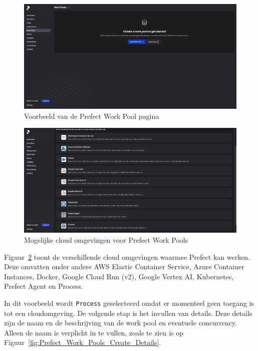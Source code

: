 \begin{figure}[h]
    \centering
    \includegraphics[width=0.9\linewidth]{graphics/Prefect_Work_Pools.PNG}
    \caption{Voorbeeld van de Prefect Work Pool pagina}
    \label{fig:Prefect_Work_Pools}
\end{figure}

\begin{figure}[h]
    \centering
    \includegraphics[width=0.9\linewidth]{graphics/Prefect_Work_Pools_Create.PNG}
    \caption{Mogelijke cloud omgevingen voor Prefect Work Pools}
    \label{fig:Prefect_Work_Pools_Create}
\end{figure}

Figuur~\ref{fig:Prefect_Work_Pools_Create} toont de verschillende cloud omgevingen waarmee Prefect kan werken. Deze omvatten onder andere AWS Elastic Container Service, Azure Container Instances, Docker, Google Cloud Run (v2), Google Vertex AI, Kubernetes, Prefect Agent en Process.

In dit voorbeeld wordt \texttt{Process} geselecteerd omdat er momenteel geen toegang is tot een cloudomgeving. De volgende stap is het invullen van details. Deze details zijn de naam en de beschrijving van de work pool en eventuele concurrency. Alleen de naam is verplicht in te vullen, zoals te zien is op Figuur~\ref{fig:Prefect_Work_Pools_Create_Details}.

